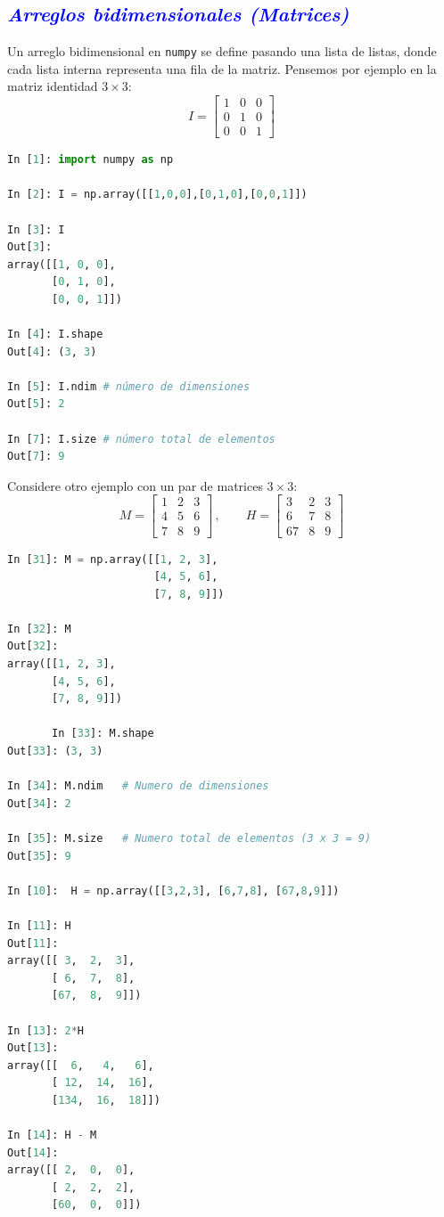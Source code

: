 \documentclass[12pt]{article}
\begin{document}
\subsection*{\textcolor{blue}{\textit{Arreglos bidimensionales (Matrices)}}}

Un arreglo bidimensional en \texttt{numpy} se define pasando una lista de listas, 
donde cada lista interna representa una fila de la matriz. 
Pensemos por ejemplo en la matriz identidad $3 \times 3$: 
%
\begin{equation*}
I = 
\begin{bmatrix}
1 & 0 & 0 \\
0 & 1 & 0 \\
0 & 0 & 1
\end{bmatrix}
\end{equation*}
%
\begin{lstlisting}[language=Python]
In [1]: import numpy as np

In [2]: I = np.array([[1,0,0],[0,1,0],[0,0,1]])

In [3]: I
Out[3]: 
array([[1, 0, 0],
       [0, 1, 0],
       [0, 0, 1]])

In [4]: I.shape
Out[4]: (3, 3)

In [5]: I.ndim # número de dimensiones
Out[5]: 2

In [7]: I.size # número total de elementos
Out[7]: 9
\end{lstlisting}
%
Considere otro ejemplo con un par de matrices $3 \times 3$:
%
\begin{equation*}
M = 
\begin{bmatrix}
1 & 2 & 3 \\
4 & 5 & 6 \\
7 & 8 & 9
\end{bmatrix}\,,\qquad
H = 
\begin{bmatrix}
3 & 2 & 3 \\
6 & 7 & 8 \\
67 & 8 & 9
\end{bmatrix}
\end{equation*}
%
\begin{lstlisting}[language=Python]
In [31]: M = np.array([[1, 2, 3], 
                       [4, 5, 6], 
                       [7, 8, 9]])

In [32]: M
Out[32]: 
array([[1, 2, 3],
       [4, 5, 6],
       [7, 8, 9]])

       In [33]: M.shape
Out[33]: (3, 3)

In [34]: M.ndim   # Numero de dimensiones
Out[34]: 2

In [35]: M.size   # Numero total de elementos (3 x 3 = 9)
Out[35]: 9

In [10]:  H = np.array([[3,2,3], [6,7,8], [67,8,9]])

In [11]: H
Out[11]: 
array([[ 3,  2,  3],
       [ 6,  7,  8],
       [67,  8,  9]])

In [13]: 2*H
Out[13]: 
array([[  6,   4,   6],
       [ 12,  14,  16],
       [134,  16,  18]])

In [14]: H - M
Out[14]: 
array([[ 2,  0,  0],
       [ 2,  2,  2],
       [60,  0,  0]])
\end{lstlisting}
%
\end{document}
